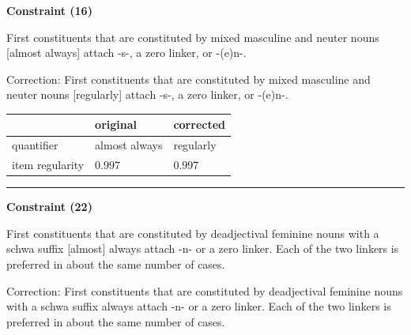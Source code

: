 \vspace{0.6em}

\begin{center}
\textbf{Constraint (16)}
\end{center}

\noindent
First constituents that are constituted by mixed masculine and neuter nouns [almost always] attach -s-, a zero linker, or -(e)n-.
\vspace{0.3em}

\noindent
Correction: First constituents that are constituted by mixed masculine and neuter nouns [regularly] attach -s-, a zero linker, or -(e)n-.

\vspace{-0.25em}

\begin{table}[!ht]

\begin{center}
\setlength{\extrarowheight}{1pt}
\begin{tabularx}{\columnwidth}{|X|X|X|}
      \hline
                        & original      & corrected \\
      \hline
      quantifier        & almost always      & regularly   \\
      \hline
      item regularity   & $0.997$      & $0.997$   \\
      \hline
\end{tabularx}
\end{center}
\end{table}

\vspace{-0.75em}
\hrule




\vspace{0.6em}

\begin{center}
\textbf{Constraint (22)}
\end{center}

\noindent
First constituents that are constituted by deadjectival feminine nouns with a schwa suffix [almost] always attach -n- or a zero linker. Each of the two linkers is preferred in about the same number of cases.
\vspace{0.3em}

\noindent
Correction: First constituents that are constituted by deadjectival feminine nouns with a schwa suffix always attach -n- or a zero linker. Each of the two linkers is preferred in about the same number of cases.

